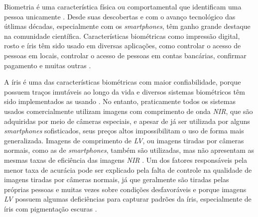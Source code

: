 
\par Biometria é uma característica física ou comportamental que identificam uma pessoa unicamente \cite{wayman2005biometric}. Desde suas descobertas e com o avanço tecnológico das útlimas décadas, especialmente com os \textit{smartphones}, têm ganho grande destaque na comunidade científica. Características biométricas como impressão digital, rosto e íris têm sido usado em diversas aplicações, como controlar o acesso de pessoas em locais, controlar o acesso de pessoas em contas bancárias, confirmar pagamento e muitas outras \cite{li2009encyclopedia, wayman2005biometric}.

\par A íris é uma das características biométricas com maior confiabilidade, porque possuem traços imutáveis ao longo da vida e diversos sistemas biométricos têm sido implementados as usando \cite{daugman2004, wayman2005biometric, iris_segmentada,othman2015}. No entanto, praticamente todos os sistemas usados comercialmente utilizam imagens com comprimento de onda \textit{\acrfull{NIR}}, que são adquiridas por meio de câmeras
especiais, e apesar de já ser utilizada por alguns \textit{smartphones} sofisticados, seus preços altos impossibilitam o uso de forma mais generalizada. Imagens de comprimento de \textit{\acrfull{LV}}, ou imagens tiradas por câmeras normais, como as
de \textit{smartphones}, também são utilizadas, mas não apresentam as mesmas taxas de eficiência das
imagens \textit{\acrshort{NIR}} \cite{proenca2011,raja2014, raja2015, trokielwicz2016-Warsaw}. Um dos fatores responsáveis pela menor taxa de acurácia pode ser explicado pela falta de controle na qualidade de imagens tiradas por câmeras normais, já que geralmente são tiradas pelas próprias pessoas e muitas vezes sobre condições desfavoráveis e porque imagens \textit{\acrshort{LV}} possuem algumas deficiências para capturar padrões da íris, especialmente de íris com pigmentação escuras \cite{abdullah2015}. 

